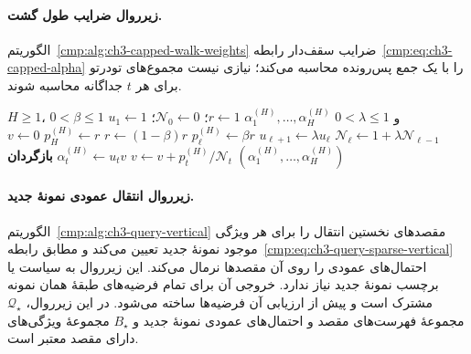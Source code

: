 \paragraph{زیرروال ضرایب طول گشت.}
الگوریتم~\ref{cmp:alg:ch3-capped-walk-weights}
ضرایب سقف‌دار
رابطه~\eqref{cmp:eq:ch3-capped-alpha}
را با یک جمع پس‌رونده محاسبه می‌کند؛
نیازی نیست مجموع‌های تودرتو
برای هر $t$ جداگانه محاسبه شوند.
\begin{algorithm}[!htbp]
\caption{زیرروال $\operatorname{CappedWeights}$ برای ضرایب گشت}
\label{cmp:alg:ch3-capped-walk-weights}
\begin{algorithmic}[1]
\REQUIRE $H\ge1$، $0<\beta\le1$ و $0<\lambda\le1$
\ENSURE $\alpha_1^{(H)},\ldots,\alpha_H^{(H)}$
\STATE $r\gets1$؛ $\mathcal N_0\gets0$؛ $u_1\gets1$
    \STATE $\mathcal N_\ell\gets1+\lambda\mathcal N_{\ell-1}$
        \STATE $u_{\ell+1}\gets\lambda u_\ell$
        \STATE $p_\ell^{(H)}\gets\beta r$
        \STATE $r\gets(1-\beta)r$
    \ELSE
        \STATE $p_H^{(H)}\gets r$
    \ENDIF
\ENDFOR
\STATE $v\gets0$
    \STATE $v\gets v+p_t^{(H)}/\mathcal N_t$
    \STATE $\alpha_t^{(H)}\gets u_t v$
\ENDFOR
\STATE \textbf{بازگردان} $(\alpha_1^{(H)},\ldots,\alpha_H^{(H)})$
\end{algorithmic}
\end{algorithm}

\paragraph{زیرروال انتقال عمودی نمونهٔ جدید.}
الگوریتم~\ref{cmp:alg:ch3-query-vertical}
مقصدهای نخستین انتقال را برای هر ویژگی موجود
نمونهٔ جدید تعیین می‌کند و مطابق
رابطه~\eqref{cmp:eq:ch3-query-sparse-vertical}
احتمال‌های عمودی را روی آن مقصدها نرمال می‌کند.
این زیرروال به سیاست یا برچسب نمونهٔ جدید نیاز ندارد.
خروجی آن برای تمام فرضیه‌های طبقهٔ همان نمونه
مشترک است و پیش از ارزیابی آن فرضیه‌ها ساخته می‌شود.
در این زیرروال، $\mathcal Q_\star$ مجموعهٔ
فهرست‌های مقصد و احتمال‌های عمودی نمونهٔ جدید
و $B_\star$ مجموعهٔ ویژگی‌های دارای مقصد معتبر است.

